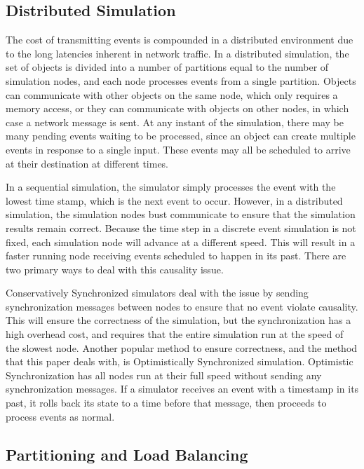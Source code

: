\documentclass{wscpaperproc}
\begin{document}
\subsection{Distributed Simulation}

The cost of transmitting events is compounded in a distributed environment due to the long latencies inherent in network traffic. In a distributed simulation, the set of objects is divided into a number of partitions equal to the number of simulation nodes, and each node processes events from a single partition. Objects can communicate with other objects on the same node, which only requires a memory access, or they can communicate with objects on other nodes, in which case a network message is sent. At any instant of the simulation, there may be many pending events waiting to be processed, since an object can create multiple events in response to a single input. These events may all be scheduled to arrive at their destination at different times.

In a sequential simulation, the simulator simply processes the event with the lowest time stamp, which is the next event to occur. However, in a distributed simulation, the simulation nodes bust communicate to ensure that the simulation results remain correct. Because the time step in a discrete event simulation is not fixed, each simulation node will advance at a different speed. This will result in a faster running node receiving events scheduled to happen in its past. There are two primary ways to deal with this causality issue. 

Conservatively Synchronized simulators deal with the issue by sending synchronization messages between nodes to ensure that no event violate causality. This will ensure the correctness of the simulation, but the synchronization has a high overhead cost, and requires that the entire simulation run at the speed of the slowest node. Another popular method to ensure correctness, and the method that this paper deals with, is Optimistically Synchronized simulation. Optimistic Synchronization has all nodes run at their full speed without sending any synchronization messages. If a simulator receives an event with a timestamp in its past, it rolls back its state to a time before that message, then proceeds to process events as normal. 

\subsection{Partitioning and Load Balancing}
\end{document}
